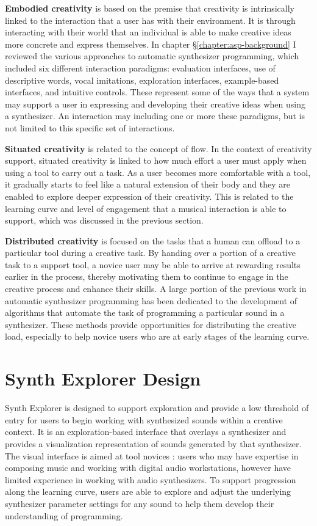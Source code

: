 \textbf{Embodied creativity} is based on the premise that creativity is intrinsically linked to the interaction that a user has with their environment. It is through interacting with their world that an individual is able to make creative ideas more concrete and express themselves. In chapter \S\ref{chapter:asp-background} I reviewed the various approaches to automatic synthesizer programming, which included six different interaction paradigms: evaluation interfaces, use of descriptive words, vocal imitations, exploration interfaces, example-based interfaces, and intuitive controls. These represent some of the ways that a system may support a user in expressing and developing their creative ideas when using a synthesizer. An interaction may including one or more these paradigms, but is not limited to this specific set of interactions.

\textbf{Situated creativity} is related to the concept of flow. In the context of creativity support, situated creativity is linked to how much effort a user must apply when using a tool to carry out a task. As a user becomes more comfortable with a tool, it gradually starts to feel like a natural extension of their body and they are enabled to explore deeper expression of their creativity. This is related to the learning curve and level of engagement that a musical interaction is able to support, which was discussed in the previous section.

\textbf{Distributed creativity} is focused on the tasks that a human can offload to a particular tool during a creative task. By handing over a portion of a creative task to a support tool, a novice user may be able to arrive at rewarding results earlier in the process, thereby motivating them to continue to engage in the creative process and enhance their skills. A large portion of the previous work in automatic synthesizer programming has been dedicated to the development of algorithms that automate the task of programming a particular sound in a synthesizer. These methods provide opportunities for distributing the creative load, especially to help novice users who are at early stages of the learning curve.

\section{Synth Explorer Design}
Synth Explorer is designed to support exploration and provide a low threshold of entry for users to begin working with synthesized sounds within a creative context. It is an exploration-based interface that overlays a synthesizer and provides a visualization representation of sounds generated by that synthesizer. The visual interface is aimed at tool novices \cite{davis2013toward}: users who may have expertise in composing music and working with digital audio workstations, however have limited experience in working with audio synthesizers. To support progression along the learning curve, users are able to explore and adjust the underlying synthesizer parameter settings for any sound to help them develop their understanding of programming.

